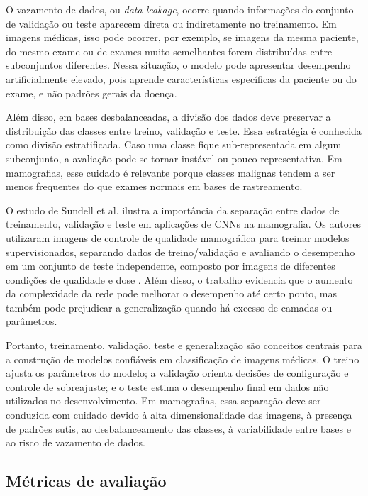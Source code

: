 \documentclass[
    12pt,
    openright,
    oneside,
    a4paper,
    english,
    brazil
]{abntex2}
\begin{document}
O vazamento de dados, ou \textit{data leakage}, ocorre quando informações do conjunto de validação ou teste aparecem direta ou indiretamente no treinamento. Em imagens médicas, isso pode ocorrer, por exemplo, se imagens da mesma paciente, do mesmo exame ou de exames muito semelhantes forem distribuídas entre subconjuntos diferentes. Nessa situação, o modelo pode apresentar desempenho artificialmente elevado, pois aprende características específicas da paciente ou do exame, e não padrões gerais da doença.

Além disso, em bases desbalanceadas, a divisão dos dados deve preservar a distribuição das classes entre treino, validação e teste. Essa estratégia é conhecida como divisão estratificada. Caso uma classe fique sub-representada em algum subconjunto, a avaliação pode se tornar instável ou pouco representativa. Em mamografias, esse cuidado é relevante porque classes malignas tendem a ser menos frequentes do que exames normais em bases de rastreamento.

O estudo de Sundell et al. ilustra a importância da separação entre dados de treinamento, validação e teste em aplicações de CNNs na mamografia. Os autores utilizaram imagens de controle de qualidade mamográfica para treinar modelos supervisionados, separando dados de treino/validação e avaliando o desempenho em um conjunto de teste independente, composto por imagens de diferentes condições de qualidade e dose \cite{sundell2022cnn}. Além disso, o trabalho evidencia que o aumento da complexidade da rede pode melhorar o desempenho até certo ponto, mas também pode prejudicar a generalização quando há excesso de camadas ou parâmetros.

Portanto, treinamento, validação, teste e generalização são conceitos centrais para a construção de modelos confiáveis em classificação de imagens médicas. O treino ajusta os parâmetros do modelo; a validação orienta decisões de configuração e controle de sobreajuste; e o teste estima o desempenho final em dados não utilizados no desenvolvimento. Em mamografias, essa separação deve ser conduzida com cuidado devido à alta dimensionalidade das imagens, à presença de padrões sutis, ao desbalanceamento das classes, à variabilidade entre bases e ao risco de vazamento de dados.

\subsection{Métricas de avaliação}
\label{subsec:metricas_avaliacao}
\end{document}
